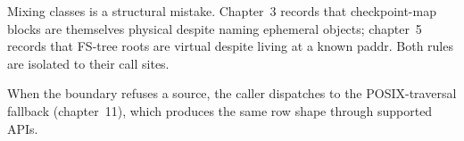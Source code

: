 Mixing classes is a structural mistake. Chapter~3 records that
checkpoint-map blocks are themselves physical despite naming
ephemeral objects; chapter~5 records that FS-tree roots are virtual
despite living at a known paddr. Both rules are isolated to their
call sites.

When the boundary refuses a source, the caller dispatches to the
POSIX-traversal fallback (chapter~11), which produces the same row
shape through supported APIs.
